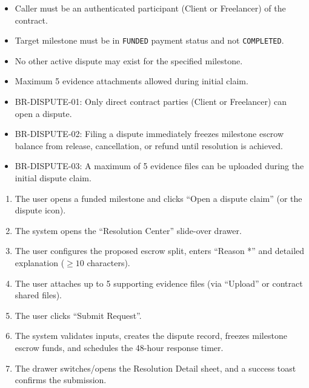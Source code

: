 \begin{itemize}[leftmargin=1.6em,topsep=3pt,itemsep=2pt,parsep=0pt,label=$\bullet$]
      \item Caller must be an authenticated participant (Client or Freelancer) of the contract.
      \item Target milestone must be in \texttt{FUNDED} payment status and not \texttt{COMPLETED}.
      \item No other active dispute may exist for the specified milestone.
      \item Maximum 5 evidence attachments allowed during initial claim.
\end{itemize}

\begin{itemize}[leftmargin=1.6em,topsep=3pt,itemsep=2pt,parsep=0pt,label=$\bullet$]\brrulelist
      \item BR-DISPUTE-01: Only direct contract parties (Client or Freelancer) can open a dispute.
      \item BR-DISPUTE-02: Filing a dispute immediately freezes milestone escrow balance from release, cancellation, or refund until resolution is achieved.
      \item BR-DISPUTE-03: A maximum of 5 evidence files can be uploaded during the initial dispute claim.
\end{itemize}

\begin{enumerate}[leftmargin=1.8em,topsep=3pt,itemsep=2pt,parsep=0pt]
      \item The user opens a funded milestone and clicks ``Open a dispute claim'' (or the dispute icon).
      \item The system opens the ``Resolution Center'' slide-over drawer.
      \item The user configures the proposed escrow split, enters ``Reason *'' and detailed explanation ($\ge 10$ characters).
      \item The user attaches up to 5 supporting evidence files (via ``Upload'' or contract shared files).
      \item The user clicks ``Submit Request''.
      \item The system validates inputs, creates the dispute record, freezes milestone escrow funds, and schedules the 48-hour response timer.
      \item The drawer switches/opens the Resolution Detail sheet, and a success toast confirms the submission.
\end{enumerate}

